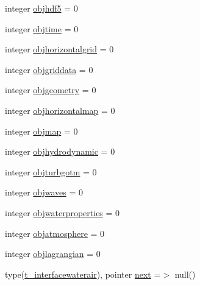 \begin{DoxyCompactItemize}
integer \mbox{\hyperlink{structmoduleinterfacewaterair_1_1t__interfacewaterair_aaef8691e3fbcefc111b495f9291bb5dc}{objhdf5}} = 0
\item 
integer \mbox{\hyperlink{structmoduleinterfacewaterair_1_1t__interfacewaterair_a69732e3520a330bb8d882f2817d719f1}{objtime}} = 0
\item 
integer \mbox{\hyperlink{structmoduleinterfacewaterair_1_1t__interfacewaterair_a444be8d247f6c5e743c76222d28124a7}{objhorizontalgrid}} = 0
\item 
integer \mbox{\hyperlink{structmoduleinterfacewaterair_1_1t__interfacewaterair_a8337349d6771fd0e996dbeed85e2be2e}{objgriddata}} = 0
\item 
integer \mbox{\hyperlink{structmoduleinterfacewaterair_1_1t__interfacewaterair_aedad6ef3cec29fd951ef7ee0c6cda7f9}{objgeometry}} = 0
\item 
integer \mbox{\hyperlink{structmoduleinterfacewaterair_1_1t__interfacewaterair_a8e7976d9ff6f5e837f87937f1bd41255}{objhorizontalmap}} = 0
\item 
integer \mbox{\hyperlink{structmoduleinterfacewaterair_1_1t__interfacewaterair_a6ff4fc8ac196080754ae2d9e030b04bc}{objmap}} = 0
\item 
integer \mbox{\hyperlink{structmoduleinterfacewaterair_1_1t__interfacewaterair_a0fe09289a5293dbc9a97b8d5e9e9f445}{objhydrodynamic}} = 0
\item 
integer \mbox{\hyperlink{structmoduleinterfacewaterair_1_1t__interfacewaterair_ae59f9b190ab45c88834370c19b339f7a}{objturbgotm}} = 0
\item 
integer \mbox{\hyperlink{structmoduleinterfacewaterair_1_1t__interfacewaterair_a8aabb0ee8e8d25621c3df982be3412d2}{objwaves}} = 0
\item 
integer \mbox{\hyperlink{structmoduleinterfacewaterair_1_1t__interfacewaterair_a664ebe919daa71e52788785c9b281ea1}{objwaterproperties}} = 0
\item 
integer \mbox{\hyperlink{structmoduleinterfacewaterair_1_1t__interfacewaterair_aeca6334907bde0eb30c9660278d8ceed}{objatmosphere}} = 0
\item 
integer \mbox{\hyperlink{structmoduleinterfacewaterair_1_1t__interfacewaterair_a2e91532be628a57f6e37b78776d51dec}{objlagrangian}} = 0
\item 
type(\mbox{\hyperlink{structmoduleinterfacewaterair_1_1t__interfacewaterair}{t\+\_\+interfacewaterair}}), pointer \mbox{\hyperlink{structmoduleinterfacewaterair_1_1t__interfacewaterair_a0af341e3f2d2117d06a4b90fee302e7a}{next}} =$>$ null()
\end{DoxyCompactItemize}


